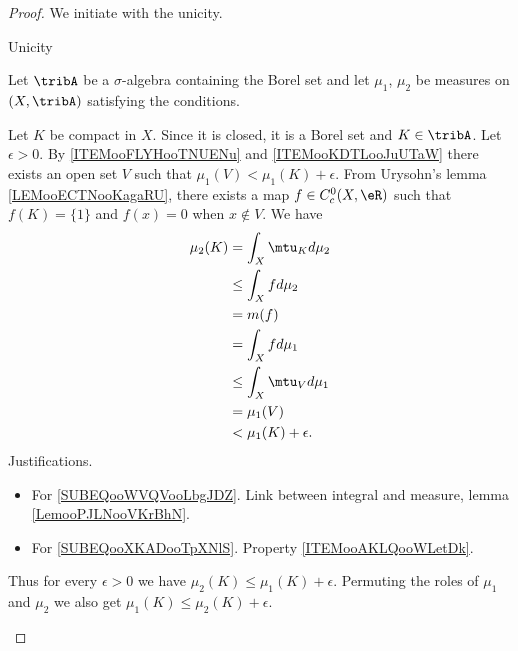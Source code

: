\begin{proof}
	We initiate with the unicity.
	\begin{center}
		Unicity
	\end{center}
	Let \( \tribA\) be a \( \sigma\)-algebra containing the Borel set and let \( \mu_1\), \( \mu_2\) be measures on \( (X,\tribA)\) satisfying the conditions.
	\begin{subproof}
		Let \( K\) be compact in \( X\). Since it is closed, it is a Borel set and \( K\in \tribA\). Let \( \epsilon>0\). By \ref{ITEMooFLYHooTNUENu} and \ref{ITEMooKDTLooJuUTaW} there exists an open set \( V\) such that \( \mu_1(V)<\mu_1(K)+\epsilon\). From Urysohn's lemma \ref{LEMooECTNooKagaRU}, there exists a map \( f\in C^0_c(X,\eR)\) such that \( f(K)=\{ 1 \}\) and \( f(x)=0\) when \( x\notin V\). We have
		\begin{subequations}
			\begin{align}
				\mu_2(K) & =\int_X\mtu_Kd\mu_2        \label{SUBEQooWVQVooLbgJDZ} \\
				         & \leq \int_Xfd\mu_2                                     \\
				         & =m(f)                  \label{SUBEQooXKADooTpXNlS}     \\
				         & = \int_Xfd\mu_1                                        \\
				         & \leq \int_X\mtu_{V}d\mu_1                              \\
				         & =\mu_1(V)                                              \\
				         & <\mu_1(K)+\epsilon.
			\end{align}
		\end{subequations}
		Justifications.
		\begin{itemize}
			\item For \eqref{SUBEQooWVQVooLbgJDZ}. Link between integral and measure, lemma \ref{LemooPJLNooVKrBhN}.
			\item For \eqref{SUBEQooXKADooTpXNlS}. Property \ref{ITEMooAKLQooWLetDk}.
		\end{itemize}
		Thus for every \( \epsilon>0\) we have \( \mu_2(K)\leq \mu_1(K)+\epsilon\). Permuting the roles of \( \mu_1\) and \( \mu_2\) we also get \( \mu_1(K)\leq \mu_2(K)+\epsilon\).


\end{subproof}
\end{proof}
